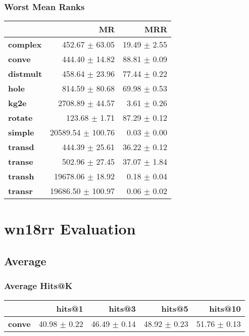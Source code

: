 \documentclass{article}
\begin{document}
    \subsubsection{Worst Mean Ranks}
    \begin{center}
    \begin{tabular}{lrr}
\toprule
{} &                 MR &           MRR \\
\midrule
\textbf{complex } &     452.67 $\pm$ 63.05 &  19.49 $\pm$ 2.55 \\
\textbf{conve   } &     444.40 $\pm$ 14.82 &  88.81 $\pm$ 0.09 \\
\textbf{distmult} &     458.64 $\pm$ 23.96 &  77.44 $\pm$ 0.22 \\
\textbf{hole    } &     814.59 $\pm$ 80.68 &  69.98 $\pm$ 0.53 \\
\textbf{kg2e    } &    2708.89 $\pm$ 44.57 &   3.61 $\pm$ 0.26 \\
\textbf{rotate  } &      123.68 $\pm$ 1.71 &  87.29 $\pm$ 0.12 \\
\textbf{simple  } &  20589.54 $\pm$ 100.76 &   0.03 $\pm$ 0.00 \\
\textbf{transd  } &     444.39 $\pm$ 25.61 &  36.22 $\pm$ 0.12 \\
\textbf{transe  } &     502.96 $\pm$ 27.45 &  37.07 $\pm$ 1.84 \\
\textbf{transh  } &   19678.06 $\pm$ 18.92 &   0.18 $\pm$ 0.04 \\
\textbf{transr  } &  19686.50 $\pm$ 100.97 &   0.06 $\pm$ 0.02 \\
\bottomrule
\end{tabular}

    \end{center}

\section{wn18rr Evaluation}
    \subsection{Average}
    \subsubsection{Average Hits@K}
    \begin{center}
    \begin{tabular}{lrrrr}
\toprule
{} &        hits@1 &        hits@3 &        hits@5 &       hits@10 \\
\midrule
\textbf{conve} &  40.98 $\pm$ 0.22 &  46.49 $\pm$ 0.14 &  48.92 $\pm$ 0.23 &  51.76 $\pm$ 0.13 \\
\bottomrule
\end{tabular}

    \end{center}
\end{document}
